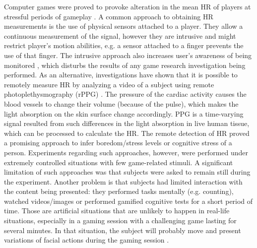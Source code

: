 Computer games were proved to provoke alteration in the mean HR of players at stressful periods of gameplay \parencite{sharma2006assessment,rodriguez2015vr}. A common approach to obtaining HR measurements is the use of physical sensors attached to a player. They allow a continuous measurement of the signal, however they are intrusive and might restrict player's motion abilities, e.g. a sensor attached to a finger prevents the use of that finger. The intrusive approach also increases user's awareness of being monitored \parencite{yamakoshi2007preliminary,yamaguchi2006evaluation,healey2005detecting}, which disturbs the results of any game research investigation being performed.
As an alternative, investigations \parencite{mcduff2015survey} have shown that it is possible to remotely measure HR by analyzing a video of a subject using remote photoplethysmography (rPPG) \parencite{allen2007photoplethysmography}. The pressure of the cardiac activity causes the blood vessels to change their volume (because of the pulse), which makes the light absorption on the skin surface change accordingly. PPG is a time-varying signal resulted from such differences in the light absorption in live human tissue, which can be processed to calculate the HR. The remote detection of HR proved a promising approach to infer boredom/stress levels \parencite{kukolja2014comparative} or cognitive stress \parencite{mcduff2014remote} of a person. Experiments regarding such approaches, however, were performed under extremely controlled situations with few game-related stimuli. A significant limitation of such approaches was that subjects were asked to remain still during the experiment. Another problem is that subjects had limited interaction with the content being presented: they performed tasks mentally (e.g. counting), watched videos/images or performed gamified cognitive tests for a short period of time. Those are artificial situations that are unlikely to happen in real-life situations, especially in a gaming session with a challenging game lasting for several minutes. In that situation, the subject will probably move and present variations of facial actions during the gaming session \parencite{bevilacqua2016variations}.

